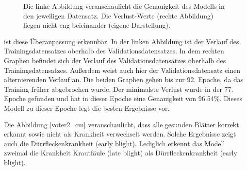 \begin{figure}[h!]
	
	\hfill
	\hfill
	\hfill
	\caption{Die linke Abbildung veranschaulicht die Genauigkeit des Modells in den jeweiligen Datensatz. Die Verlust-Werte (rechte Abbildung) liegen nicht eng beieinander (eigene Darstellung).
	}
	\label{eval_acc_loss_voter2}
\end{figure}

ist diese Überanpassung erkennbar. In der linken Abbildung ist der Verlauf des Trainingsdatensatzes oberhalb des Validationsdatensatzes. In dem rechten Graphen befindet sich der Verlauf des Validationsdatensatzes oberhalb des Trainingsdatensatzes. Außerdem weist auch hier der Validationsdatensatz einen alternierenden Verlauf an. Die beiden Graphen gehen bis zur 92. Epoche, da das Training früher abgebrochen wurde. Der minimalste Verlust wurde in der 77. Epoche gefunden und hat in dieser Epoche eine Genauigkeit von 96.54\%. Dieses Modell zu dieser Epoche legt die besten Ergebnisse vor.



Die Abbildung \ref{voter2_cm} veranschaulicht, dass alle gesunden Blätter korrekt erkannt sowie nicht als Krankheit verwechselt werden. Solche Ergebnisse zeigt auch die Dürrfleckenkrankheit (early blight). Lediglich erkennt das Modell zweimal die Krankheit Krautfäule (late blight) als Dürrfleckenkrankheit (early blight).


